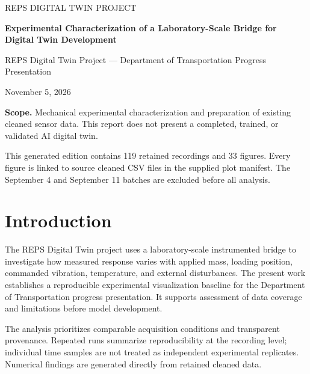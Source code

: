 \documentclass[10pt,letterpaper]{article}
\begin{document}
\begin{titlepage}\centering\vspace*{0.8in}
{\color{repsblue}\Large REPS DIGITAL TWIN PROJECT\par}\vspace{0.35in}

{\Huge\bfseries Experimental Characterization of a Laboratory-Scale Bridge for Digital Twin Development\par}\vspace{0.4in}

{\Large REPS Digital Twin Project --- Department of Transportation Progress Presentation\par}\vspace{0.25in}

{\large November 5, 2026\par}\vfill

\begin{minipage}{0.88\textwidth}\textbf{Scope.} Mechanical experimental characterization and preparation of existing cleaned sensor data. This report does not present a completed, trained, or validated AI digital twin.\par
This generated edition contains 119 retained recordings and 33 figures. Every figure is linked to source cleaned CSV files in the supplied plot manifest. The September 4 and September 11 batches are excluded before all analysis.

\end{minipage}\vspace{0.5in}\end{titlepage}
\tableofcontents\clearpage
\section{Introduction}
The REPS Digital Twin project uses a laboratory-scale instrumented bridge to investigate how measured response varies with applied mass, loading position, commanded vibration, temperature, and external disturbances. The present work establishes a reproducible experimental visualization baseline for the Department of Transportation progress presentation. It supports assessment of data coverage and limitations before model development.

The analysis prioritizes comparable acquisition conditions and transparent provenance. Repeated runs summarize reproducibility at the recording level; individual time samples are not treated as independent experimental replicates. Numerical findings are generated directly from retained cleaned data.
\end{document}
